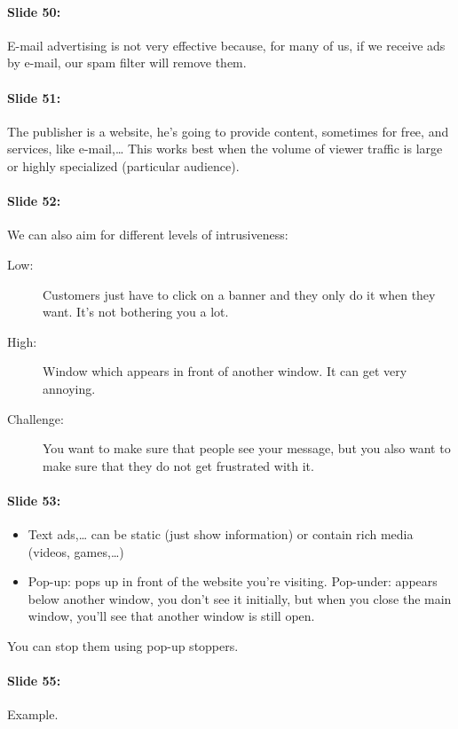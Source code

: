\documentclass[10pt,a4paper]{report}
\begin{document}
\paragraph{Slide 50:}E-mail advertising is not very effective because, for many of us, if we receive ads by e-mail, our spam filter will remove them.

\paragraph{Slide 51:}The publisher is a website, he's going to provide content, sometimes for free, and services, like e-mail,… This works best when the volume of viewer traffic is large or highly specialized (particular audience).

\paragraph{Slide 52:}We can also aim for different levels of intrusiveness:
\begin{description}
\item[Low:]Customers just have to click on a banner and they only do it when they want. It's not bothering you a lot.
\item[High:]Window which appears in front of another window. It can get very annoying. 
\item[Challenge:]You want to make sure that people see your message, but you also want to make sure that they do not get frustrated with it.
\end{description}

\paragraph{Slide 53:}
\begin{itemize}
\item Text ads,… can be static (just show information) or contain rich media (videos, games,…)
\item Pop-up: pops up in front of the website you're visiting. Pop-under: appears below another window, you don’t see it initially, but when you close the main window, you'll see that another window is still open.
\end{itemize}
You can stop them using pop-up stoppers.

\paragraph{Slide 55:}Example.
\end{document}
